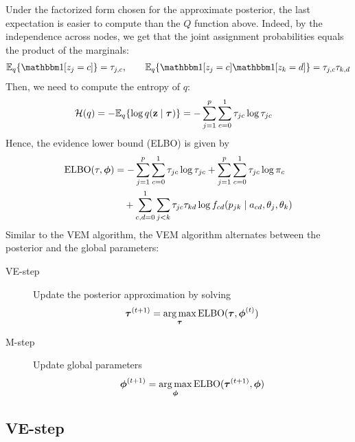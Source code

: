 \documentclass[english]{article}
\begin{document}
Under the factorized form chosen for the approximate posterior, the last expectation is easier to 
compute than the $Q$ function above. Indeed, by the independence across nodes, we get that the joint
assignment probabilities equals the product of the marginals:
\begin{align*}
\bbE_q\{\ind[z_j=c]\} = \tau_{j,c},\qquad 
    \bbE_q\{\ind[z_j=c]\ind[z_k=d] \} = \tau_{j,c}\tau_{k,d}
\end{align*}
Then, we need to compute the entropy of $q$:
\begin{align*}
    \mathcal H(q)
    &= 
    -{\mathbb E}_q\{\log q({\mathbf z}\mid {\boldsymbol \tau})\} 
    = -\sum_{j=1}^{p}\sum_{c=0}^{1} \tau_{jc}\log\tau_{jc}
\end{align*}
Hence, the evidence lower bound (ELBO) is given by
\begin{align*}
     \operatorname{ELBO}(\tau, {\boldsymbol \phi})
    &=
    -\sum_{j=1}^{p}\sum_{c=0}^{1} \tau_{jc}\log\tau_{jc} +
    \sum_{j=1}^{p}\sum_{c=0}^{1} \tau_{jc}\log\pi_{c} \\
    &\quad +
    \sum_{c,d=0}^{1}\sum_{j<k} \tau_{jc}\tau_{kd}\log f_{cd}(p_{jk}\mid a_{cd}, \theta_j, \theta_k)
\end{align*}
Similar to the VEM algorithm, the VEM algorithm alternates between the posterior and the global parameters:
\begin{description}
    \item[VE-step] Update the posterior approximation by solving
    \begin{align*}
        {\boldsymbol \tau}^{(t+1)} = \underset{{\boldsymbol \tau}}{\arg\max } \operatorname{ELBO}({\boldsymbol \tau}, {\boldsymbol \phi}^{(t)})
    \end{align*}
    \item[M-step] Update global parameters
    \begin{align*}
        {\boldsymbol \phi}^{(t+1)} = \underset{{\boldsymbol \phi}}{\arg\max}\operatorname{ELBO}({\boldsymbol \tau}^{(t+1)}, {\boldsymbol \phi})
    \end{align*}
\end{description}

\subsection{VE-step}
\end{document}
